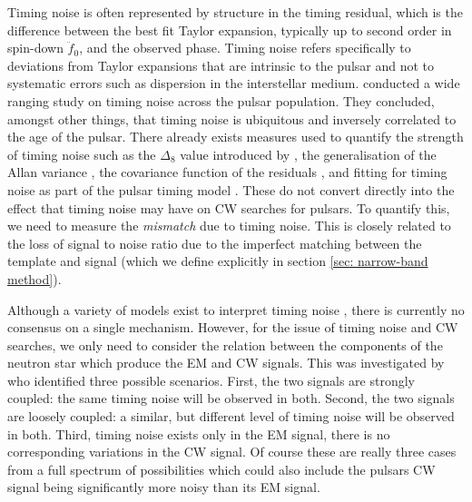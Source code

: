\documentclass[../full_thesis/full_thesis.tex]{subfiles}
\begin{document}
Timing noise is
often represented by structure in the timing residual, which is the difference
between the best fit Taylor expansion, typically up to second order in spin-down
$\ddot{f}_0$, and the observed phase. Timing noise refers specifically to
deviations from Taylor expansions that are intrinsic to the pulsar and not to
systematic errors such as dispersion in the interstellar medium.
\citet{Hobbs2010} conducted a wide ranging study on timing noise across the
pulsar population.  They concluded, amongst other things, that timing noise is
ubiquitous and inversely correlated to the age of the pulsar.  There already
exists measures used to quantify the strength of timing noise such as the
$\Delta_{8}$ value introduced by \citet{Arzoumanian1994}, the generalisation
of the Allan variance \citep{Matsakis1997}, the covariance function of the
residuals \citep{Coles2011}, and fitting for timing noise as part of the pulsar
timing model \citep{Lentati2014}. These do not convert directly
into the effect that timing noise may have on CW searches for pulsars. To quantify this, we
need to measure the \emph{mismatch} due to timing noise. This is closely
related to the loss of signal to noise ratio due to the imperfect matching
between the template and signal (which we define explicitly in section
\ref{sec: narrow-band method}).

Although a variety of models exist to interpret timing noise \citep{Lyne2010, Cordes1981}, there is
currently no consensus on a single mechanism. However, for the issue of timing
noise and CW searches, we only need to consider the relation between the
components of the neutron star which produce the EM and CW signals.  This was
investigated by \citet{Jones2004} who identified three possible scenarios.
First, the two signals are strongly coupled: the same timing noise will be
observed in both. Second, the two signals are loosely coupled: a similar, but
different level of timing noise will be observed in both. Third, timing noise
exists only in the EM signal, there is no corresponding variations in the CW
signal. Of course these are really three cases from a full spectrum of
possibilities which could also include the pulsars CW signal being significantly more noisy than its EM signal.
\end{document}
